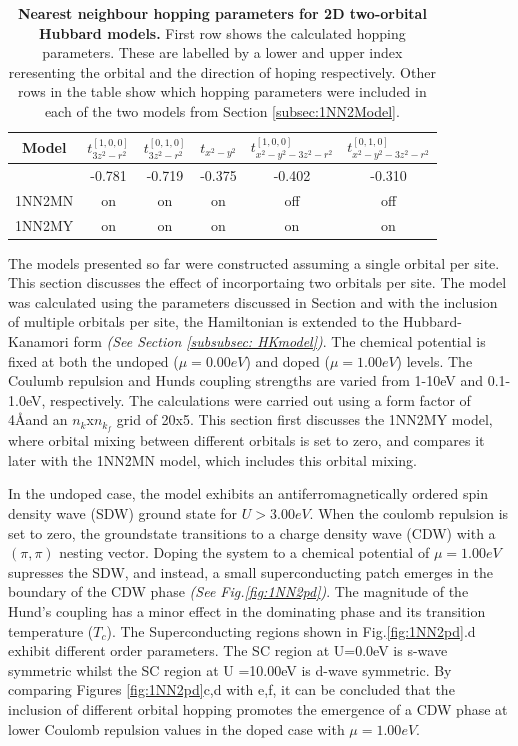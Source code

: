 \documentclass[12pt]{article}
\begin{document}
\begin{table}[h]
    \centering
    \begin{tabular}{|c|c|c|c|c|c|}
        \hline
       Model &$t^{[1,0,0]}_{3z^2-r^2}$  &$t^{[0,1,0]}_{3z^2-r^2}$  &  $t_{x^2 - y^2}$ &  $t^{[1,0,0]}_{x^2 - y^2 -3z^2-r^2} $ & $t^{[0,1,0]}_{x^2 - y^2 -3z^2-r^2} $ \\
        \hline
        & -0.781 & -0.719  &  -0.375 & -0.402 & -0.310\\
        \hline
        1NN2MN & on &  on  & on  & off & off  \\
        \hline
        1NN2MY & on &  on  & on  & on & on \\
          
        \hline
    \end{tabular}
    \caption{\textbf{Nearest neighbour hopping parameters for 2D  two-orbital Hubbard models.} First row shows the calculated hopping parameters.
    These are labelled by a lower and upper index reresenting the orbital and the direction of hoping respectively.
    Other rows in the table show which hopping parameters were included in each of the two models from Section \ref{subsec:1NN2Model}.}
    \label{tab:2D2orbparams }
\end{table}



The models presented so far were constructed assuming a single orbital per site. This section discusses the effect of incorportaing
two orbitals per site. The model was calculated using the parameters discussed in Section  and with the inclusion of 
multiple orbitals per site, the  Hamiltonian is extended to the Hubbard-Kanamori form \textit{(See Section \ref{subsubsec: HKmodel})}. 
The chemical potential is fixed at both the undoped ($\mu = 0.00eV $) and doped ($\mu =1.00eV$) levels. The Coulumb repulsion and Hunds coupling strengths are varied from 1-10eV and 0.1-1.0eV, respectively.
The calculations were carried out using a form factor of 4\AA and an $n_k$x$n_{k_f}$ grid of 20x5. 
This section first discusses the 1NN2MY model, where orbital mixing between different orbitals is set to zero, and compares it later with the 1NN2MN model, which includes this orbital mixing. \par
\medskip
\noindent In the undoped case, the model exhibits an antiferromagnetically ordered spin density wave (SDW) ground state
for $U > 3.00eV$. When the coulomb repulsion is set to zero, the groundstate transitions to a charge density wave (CDW) with a $(\pi, \pi)$ nesting vector. 
Doping the system to a chemical potential of $\mu = 1.00eV$ supresses the SDW, and instead, a small superconducting patch 
emerges in the boundary of the CDW phase \textit{(See Fig.{\ref{fig:1NN2pd}})}. The magnitude of the Hund's coupling has a minor effect in the dominating phase and its transition temperature  ($T_c$).
The Superconducting regions shown in Fig.\ref{fig:1NN2pd}.d exhibit different order parameters. The SC region at U=0.0eV is s-wave symmetric whilst the SC region at U =10.00eV
is d-wave symmetric. By comparing Figures \ref{fig:1NN2pd}c,d with e,f, it can be concluded that the inclusion of different orbital hopping promotes the emergence of a CDW phase at lower Coulomb repulsion values in the doped case with $\mu = 1.00eV$.
\end{document}
